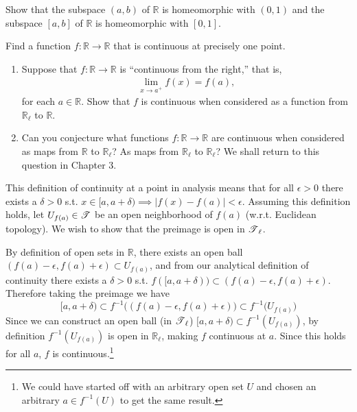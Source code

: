   \begin{exercise}[Munkres 18.5]
    Show that the subspace $(a, b)$ of $\mathbb{R}$ is homeomorphic with $(0, 1)$ and the subspace $[a, b]$ of $\mathbb{R}$ is homeomorphic with $[0, 1]$.
  \end{exercise}

  \begin{exercise}[Munkres 18.6]
    Find a function $f : \mathbb{R} \to \mathbb{R}$ that is continuous at precisely one point.
  \end{exercise}

  \begin{exercise}[Munkres 18.7]
    \begin{enumerate}
      \item Suppose that $f : \mathbb{R} \to \mathbb{R}$ is ``continuous from the right,'' that is,
      \begin{align*}
        \lim_{x \to a^+} f(x) = f(a),
      \end{align*}
      for each $a \in \mathbb{R}$. Show that $f$ is continuous when considered as a function from $\mathbb{R}_\ell$ to $\mathbb{R}$.
      \item Can you conjecture what functions $f : \mathbb{R} \to \mathbb{R}$ are continuous when considered as maps from $\mathbb{R}$ to $\mathbb{R}_\ell$? As maps from $\mathbb{R}_\ell$ to $\mathbb{R}_\ell$? We shall return to this question in Chapter 3.
    \end{enumerate}
  \end{exercise}
  \begin{solution}
    This definition of continuity at a point in analysis means that for all $\epsilon > 0$ there exists a $\delta > 0$ s.t. $x \in [a, a + \delta) \implies |f(x) - f(a)| < \epsilon$. Assuming this definition holds, let $U_{f(a)} \in \T$ be an open neighborhood of $f(a)$ (w.r.t. Euclidean topology). We wish to show that the preimage is open in $\T_\ell$. 

    By definition of open sets in $\mathbb{R}$, there exists an open ball $(f(a) - \epsilon, f(a) + \epsilon) \subset U_{f(a)}$, and from our analytical definition of continuity there exists a $\delta > 0$ s.t. $f([a, a + \delta)) \subset (f(a) - \epsilon, f(a) + \epsilon)$. Therefore taking the preimage we have 
    \begin{equation}
      [a, a+\delta) \subset f^{-1} \big( (f(a) - \epsilon, f(a) + \epsilon ) \big) \subset f^{-1} \big( U_{f(a)} \big)
    \end{equation}
    Since we can construct an open ball (in $\T_\ell$) $[a, a + \delta) \subset f^{-1} (U_{f(a)})$, by definition $f^{-1} (U_{f(a)})$ is open in $\mathbb{R}_\ell$, making $f$ continuous at $a$. Since this holds for all $a$, $f$ is continuous.\footnote{We could have started off with an arbitrary open set $U$ and chosen an arbitrary $a \in f^{-1} (U)$ to get the same result.} 
  \end{solution}

